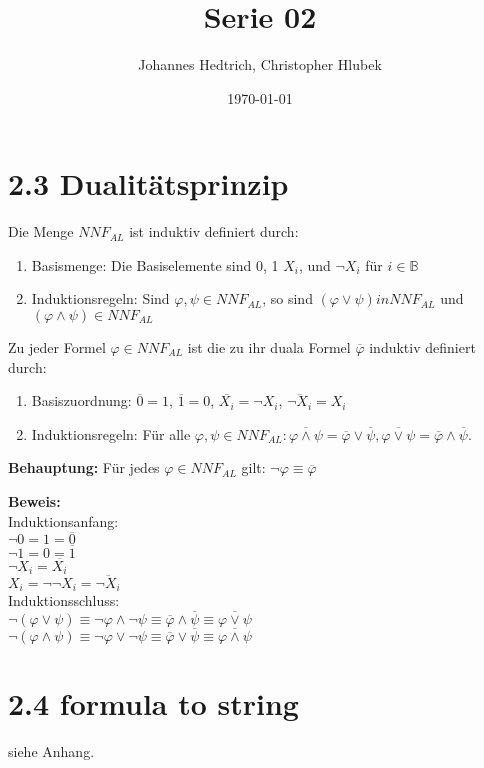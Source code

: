 \documentclass[12pt,a4paper]{scrartcl}
\title{Serie 02}
\author{Johannes Hedtrich, Christopher Hlubek}
\date{\today}
\begin{document}
\section*{2.3 Dualitätsprinzip}

Die Menge $NNF_{AL}$ ist induktiv definiert durch:
\begin{enumerate}
  \item Basismenge: Die Basiselemente sind 0, 1 $X_i$, und $\neg X_i$ für $i \in \mathbb{B}$
  \item I\lstset{language=c++}nduktionsregeln: Sind $\varphi, \psi \in NNF_{AL}$, so sind $(\varphi \vee \psi) in NNF_{AL}$ und $(\varphi \wedge \psi) \in NNF_{AL}$
\end{enumerate}

Zu jeder Formel $\varphi \in NNF_{AL}$ ist die zu ihr duala Formel $\overline{\varphi}$ induktiv definiert durch:
\begin{enumerate}
  \item Basiszuordnung: $\overline{0} = 1$, $\overline{1} = 0$, $\overline{X_i} = \neg X_i$, $\overline{\neg X_i} = X_i$
  \item Induktionsregeln: Für alle $\varphi, \psi \in NNF_{AL}: \overline{\varphi \wedge \psi} = \overline{\varphi} \vee \overline{\psi}, \overline{\varphi \vee \psi} = \overline{\varphi} \wedge \overline{\psi}$.
\end{enumerate}

\textbf{Behauptung:} Für jedes $\varphi \in NNF_{AL}$ gilt: $\neg \varphi \equiv \overline{\varphi}$

\textbf{Beweis:}\\
Induktionsanfang:\\
$\neg 0 = 1 = \overline{0}$\\
$\neg 1 = 0 = \overline{1}$\\
$\neg X_i = \overline{X_i}$\\
$X_i = \neg \neg X_i = \overline{\neg X_i}$\\

Induktionsschluss:\\
$\neg (\varphi \vee \psi) \equiv \neg \varphi \wedge \neg \psi \equiv \overline{\varphi} \wedge \overline{\psi} \equiv \overline{\varphi \vee \psi}$\\
$\neg (\varphi \wedge \psi) \equiv \neg \varphi \vee \neg \psi \equiv \overline{\varphi} \vee \overline{\psi} \equiv \overline{\varphi \wedge \psi}$\\

\section*{2.4 formula to string}
siehe Anhang.

\end{document}
